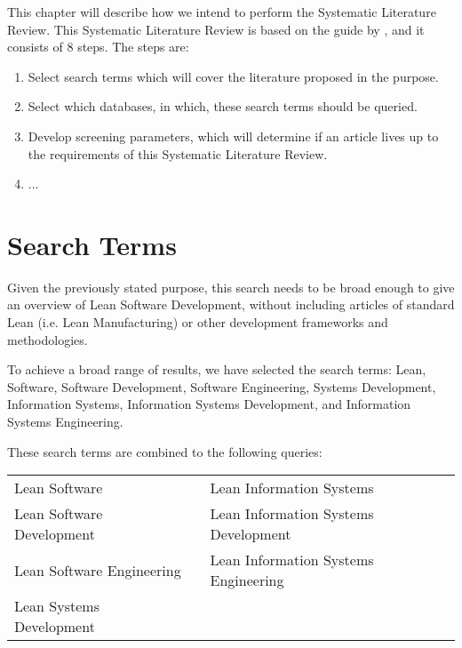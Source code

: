 This chapter will describe how we intend to perform the Systematic Literature Review.
This Systematic Literature Review is based on the guide by \citet{okoli}, and it consists of 8 steps. The steps are:
\begin{enumerate}
	\item Select search terms which will cover the literature proposed in the purpose.
	\item Select which databases, in which, these search terms should be queried.
	\item Develop screening parameters, which will determine if an article lives up to the requirements of this Systematic Literature Review.
	\item ...
\end{enumerate}

\section{Search Terms}
Given the previously stated purpose, this search needs to be broad enough to give an overview of Lean Software Development, without including articles of standard Lean (i.e. Lean Manufacturing) or other development frameworks and methodologies. 

To achieve a broad range of results, we have selected the search terms: 
Lean, 
Software, 
Software Development, 
Software Engineering, 
Systems Development, 
Information Systems, 
Information Systems Development, 
and Information Systems Engineering.

These search terms are combined to the following queries:
\begin{table}[H]
	\centering
	\begin{tabular}{ l c l }
		\tabitem Lean Software  & \hspace{1cm} & \tabitem Lean Information Systems \\ 
		\tabitem Lean Software Development & \hspace{1cm} & \tabitem Lean Information Systems Development\\ 
		\tabitem Lean Software Engineering & \hspace{1cm} & \tabitem Lean Information Systems Engineering\\ 
		\tabitem Lean Systems Development & \hspace{1cm} & \\  
	\end{tabular}
\end{table} 

